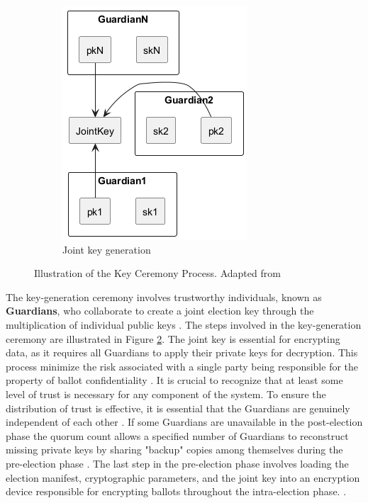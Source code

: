 \begin{figure}[ht!]
\begin{subfigure}{0.3\textwidth}
        \includegraphics[width=\textwidth]{abbildungen/Diagramme/keyceremony3.png}
        \caption{Joint key generation}
        \label{fig:jointkey}
    \end{subfigure}
    \caption{Illustration of the Key Ceremony Process. Adapted from \cite{eg-docs}}
    \label{fig:keyceremony}
\end{figure}
The key-generation ceremony involves trustworthy individuals, known as \textbf{Guardians}, who collaborate to create a joint election key through the multiplication of individual public keys \cite{eg-docs}. The steps involved in the key-generation ceremony are illustrated in Figure \ref{fig:keyceremony}. The joint key is essential for encrypting data, as it requires all Guardians to apply their private keys for decryption. This process minimize the risk associated with a single party being responsible for the property of ballot confidentiality \cite[8]{eg-paper}. It is crucial to recognize that at least some level of trust is necessary for any component of the system. To ensure the distribution of trust is effective, it is essential that the Guardians are genuinely independent of each other \cite[92]{stuve-study}. If some Guardians are unavailable in the post-election phase the quorum count allows a specified number of Guardians to reconstruct missing private keys by sharing "backup" copies among themselves during the pre-election phase \cite[8]{eg-paper}  \cite{eg-docs}. The last step in the pre-election phase involves loading the election manifest, cryptographic parameters, and the joint key into an encryption device responsible for encrypting ballots throughout the intra-election phase. \cite[8]{eg-paper}.

